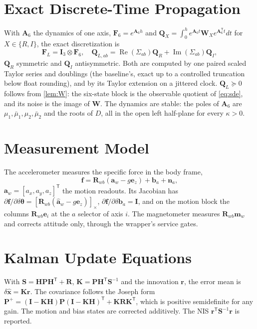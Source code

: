 \documentclass[conference]{IEEEtran}
\DeclareRobustCommand{\vct}[1]{\bm{#1}}
\DeclareRobustCommand{\mat}[1]{\bm{#1}}
\newcommand{\T}{^{\mathsf T}}
\theoremstyle{bodysmall}
\begin{document}
\section{Exact Discrete-Time Propagation}
With $\mat A_6$ the dynamics of one axis, $\mat F_6=e^{\mat A_6h}$ and
$\mat Q_X=\int_0^he^{\mat A_6t}\mat W_Xe^{\mat A_6\T t}dt$ for $X\in\{R,I\}$, the
exact discretization is
\begin{equation}
\mat F_L=\mat I_3\otimes\mat F_6,\quad
\mat Q_{L,ab}=\operatorname{Re}(\Sigma_{ab})\mat Q_R+\operatorname{Im}(\Sigma_{ab})\mat Q_I,
\label{eq:disc}
\end{equation}
$\mat Q_R$ symmetric and $\mat Q_I$ antisymmetric. Both are computed by one
paired scaled Taylor series and doublings (the baseline's, exact up to a
controlled truncation below float rounding), and by its Taylor extension on a
jittered clock. $\mat Q_L\succeq0$ follows from \cref{lem:W}: the six-state
block is the observable quotient of \eqref{eq:sde}, and its noise is the
image of $\mat W$. The dynamics are stable: the poles of $\mat A_6$ are
$\mu_1,\bar\mu_1,\mu_2,\bar\mu_2$ and the roots of $D$, all in the open left
half-plane for every $\kappa>0$.

\section{Measurement Model}
The accelerometer measures the specific force in the body frame,
\begin{equation}
\vct f=\mat R_{wb}(\vct a_w-g\vct e_z)+\vct b_a+\vct n_a,
\end{equation}
$\vct a_w=[a_x,a_y,a_z]\T$ the motion readouts. Its Jacobian has
$\partial\vct f/\partial\delta\vct\theta=[\mat R_{wb}(\hat{\vct a}_w-g\vct e_z)]_\times$,
$\partial\vct f/\partial\delta\vct b_a=\mat I$, and on the motion block the
columns $\mat R_{wb}\vct e_i$ at the $a$ selector of axis $i$. The
magnetometer measures $\mat R_{wb}\vct m_w$ and corrects attitude only,
through the wrapper's service gates.

\section{Kalman Update Equations}
With $\mat S=\mat H\mat P\mat H\T+\mat R$, $\mat K=\mat P\mat H\T\mat S^{-1}$
and the innovation $\vct r$, the error mean is $\delta\hat{\vct x}=\mat K\vct r$.
The covariance follows the Joseph form
$\mat P^+=(\mat I-\mat K\mat H)\mat P(\mat I-\mat K\mat H)\T+\mat K\mat R\mat K\T$,
which is positive semidefinite for any gain. The motion and bias states are
corrected additively. The NIS $\vct r\T\mat S^{-1}\vct r$ is reported.
\end{document}
